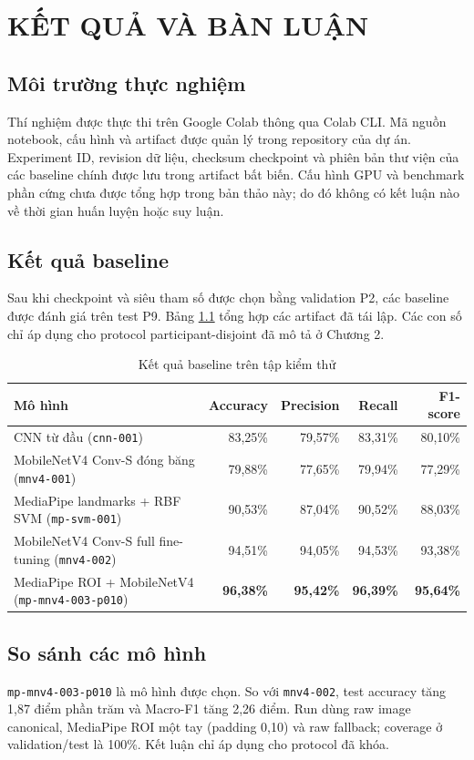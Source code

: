 \chapter{KẾT QUẢ VÀ BÀN LUẬN}

\section{Môi trường thực nghiệm}
Thí nghiệm được thực thi trên Google Colab thông qua Colab CLI. Mã nguồn notebook, cấu hình và artifact được quản lý trong repository của dự án. Experiment ID, revision dữ liệu, checksum checkpoint và phiên bản thư viện của các baseline chính được lưu trong artifact bất biến. Cấu hình GPU và benchmark phần cứng chưa được tổng hợp trong bản thảo này; do đó không có kết luận nào về thời gian huấn luyện hoặc suy luận.

\section{Kết quả baseline}
Sau khi checkpoint và siêu tham số được chọn bằng validation P2, các baseline được đánh giá trên test P9. Bảng \ref{tab:baseline-results} tổng hợp các artifact đã tái lập. Các con số chỉ áp dụng cho protocol participant-disjoint đã mô tả ở Chương 2.

\begin{table}[ht]
\centering
\small
\caption{Kết quả baseline trên tập kiểm thử}
\label{tab:baseline-results}
\begin{tabular}{p{4.6cm}rrrr}
\toprule
Mô hình & Accuracy & Precision & Recall & F1-score\\
\midrule
CNN từ đầu (\texttt{cnn-001}) & 83,25\% & 79,57\% & 83,31\% & 80,10\%\\
MobileNetV4 Conv-S đóng băng (\texttt{mnv4-001}) & 79,88\% & 77,65\% & 79,94\% & 77,29\%\\
MediaPipe landmarks + RBF SVM (\texttt{mp-svm-001}) & 90,53\% & 87,04\% & 90,52\% & 88,03\%\\
MobileNetV4 Conv-S full fine-tuning (\texttt{mnv4-002}) & 94,51\% & 94,05\% & 94,53\% & 93,38\%\\
MediaPipe ROI + MobileNetV4 (\texttt{mp-mnv4-003-p010}) & \textbf{96,38\%} & \textbf{95,42\%} & \textbf{96,39\%} & \textbf{95,64\%}\\
\bottomrule
\end{tabular}
\end{table}

\section{So sánh các mô hình}
\texttt{mp-mnv4-003-p010} là mô hình được chọn. So với \texttt{mnv4-002}, test accuracy tăng 1,87 điểm phần trăm và Macro-F1 tăng 2,26 điểm. Run dùng raw image canonical, MediaPipe ROI một tay (padding 0,10) và raw fallback; coverage ở validation/test là 100\%. Kết luận chỉ áp dụng cho protocol đã khóa.

